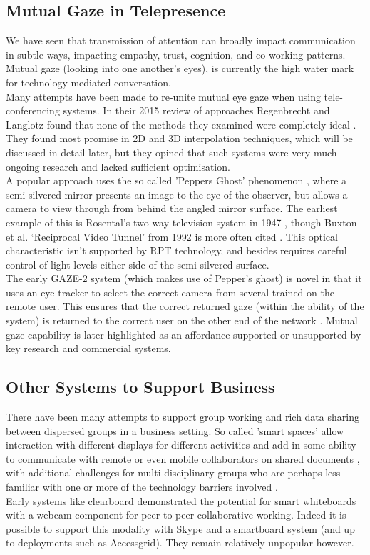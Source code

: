                    \subsection{Mutual Gaze in Telepresence}
          We have seen that transmission of attention can broadly impact communication in subtle ways, impacting empathy, trust, cognition, and co-working patterns. Mutual gaze (looking into one another's eyes), is currently the high water mark for technology-mediated conversation.\\
          Many attempts have been made to re-unite mutual eye gaze when using tele-conferencing systems. In their 2015 review of approaches Regenbrecht and Langlotz found that none of the methods they examined were completely ideal \cite{Regenbrecht2015}. They found most promise in 2D and 3D interpolation techniques, which will be discussed in detail later, but they opined that such systems were very much ongoing research and lacked sufficient optimisation.\\
          A popular approach uses the so called 'Peppers Ghost' phenomenon \cite{steinmeyer2013science}, where a semi silvered mirror presents an image to the eye of the observer, but allows a camera to view through from behind the angled mirror surface. The earliest example of this is Rosental's two way television system in 1947 \cite{rosenthal1947two}, though Buxton et al. `Reciprocal Video Tunnel' from 1992 is more often cited \cite{buxton1992telepresence}. This optical characteristic isn't supported by RPT technology, and besides requires careful control of light levels either side of the semi-silvered surface.\\  
The early GAZE-2 system (which makes use of Pepper's ghost) is novel in that it uses an eye tracker to select the correct camera from several trained on the remote user. This ensures that the correct returned gaze (within the ability of the system) is returned to the correct user on the other end of the network \cite{Vertegaal2003}.
Mutual gaze capability is later highlighted as an affordance supported or unsupported by key research and commercial systems.                           
\subsection{Other Systems to Support Business}                  
There have been many attempts to support group working and rich data sharing between dispersed groups in a business setting. So called 'smart spaces' allow interaction with different displays for different activities and add in some ability to communicate with remote or even mobile collaborators on shared documents \cite{Bardram2012}, with additional challenges for multi-disciplinary groups who are perhaps less familiar with one or more of the technology barriers involved \cite{Adamczyk2007}.\\
Early systems like clearboard \cite{Ishii1993} demonstrated the potential for smart whiteboards with a webcam component for peer to peer collaborative working. Indeed it is possible to support this modality with Skype and a smartboard system (and up to deployments such as Accessgrid). They remain relatively unpopular however.\\
